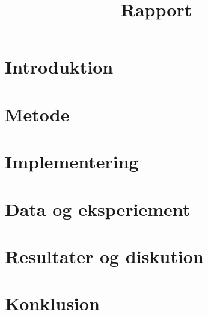 \documentclass[12pt,oneside,a4paper,english]{article}
\title{Rapport} %
\begin{document}


\newpage
\doublespacing
\renewcommand{\baselinestretch}{1}\normalsize
\tableofcontents
\renewcommand{\baselinestretch}{1}\normalsize
\thispagestyle{fancy} %

\newpage
{} 

\section{Introduktion} \label{ch1}
 

\newpage
\section{Metode} \label{ch2}


\newpage
\section{Implementering} \label{ch3}


\newpage
\section{Data og eksperiement} \label{ch4}


\newpage
\section{Resultater og diskution} \label{ch5}


\newpage
\section{Konklusion}\label{ch6}


\label{EndOfText}

\newpage
{} 
{}
\listoffigures
\thispagestyle{fancy}
\end{document}

